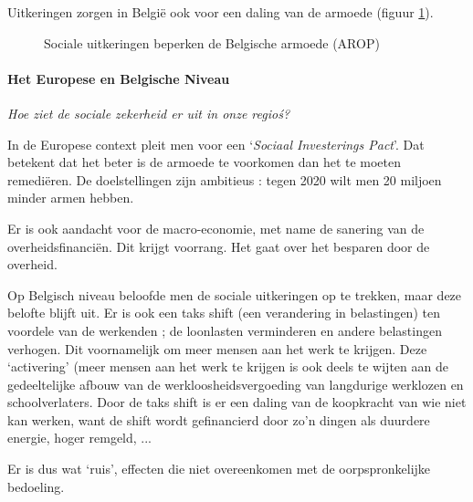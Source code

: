 Uitkeringen zorgen in Belgi\"e ook voor een daling van de armoede (figuur \ref{fig:h4uitarm}).

\begin{figure}[H]
\small\centering\captionsetup{justification=centering,margin=2cm}
\caption{Sociale uitkeringen beperken de Belgische armoede (AROP)}
\label{fig:h4uitarm}
\end{figure}

\paragraph{Het Europese en Belgische Niveau}

\textit{Hoe ziet de sociale zekerheid er uit in onze regio\'s?}\\
\par In de Europese context pleit men voor een `\textit{Sociaal Investerings Pact}'. Dat betekent dat het beter is de armoede te voorkomen dan het te moeten remedi\"eren. De doelstellingen zijn ambitieus : tegen 2020 wilt men 20 miljoen minder armen hebben. 
\par Er is ook aandacht voor de macro-economie, met name de sanering van de overheidsfinanci\"en. Dit krijgt voorrang. Het gaat over het besparen door de overheid.\\

\par Op Belgisch niveau beloofde men de sociale uitkeringen op te trekken, maar deze belofte blijft uit. Er is ook een taks shift (een verandering in belastingen) ten voordele van de werkenden ; de loonlasten verminderen en andere belastingen verhogen. Dit voornamelijk om meer mensen aan het werk te krijgen. Deze `activering' (meer mensen aan het werk te krijgen is ook deels te wijten aan de gedeeltelijke afbouw van de werkloosheidsvergoeding van langdurige werklozen en schoolverlaters. Door de taks shift is er een daling van de koopkracht van wie niet kan werken, want de shift wordt gefinancierd door zo'n dingen als duurdere energie, hoger remgeld, ...
\par Er is dus wat `ruis', effecten die niet overeenkomen met de oorpspronkelijke bedoeling.\\

